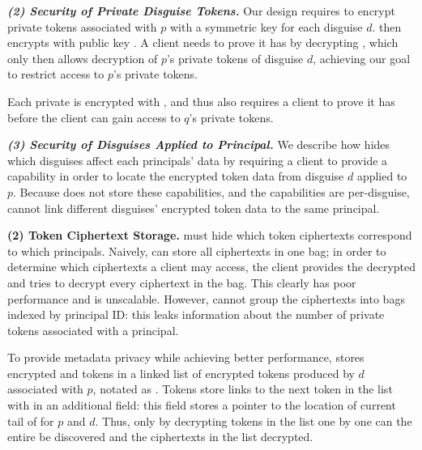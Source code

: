 \vspace{6pt}\noindent\textbf{\emph{(2) Security of Private Disguise Tokens.}}
Our design requires \sys to encrypt private \tdata{} tokens associated with $p$ with a symmetric key
 for each disguise $d$. \sys then encrypts  with public key .  
A client needs to prove it has  by decrypting , which only then allows decryption
of $p$'s private tokens of disguise $d$, achieving our goal to restrict access to $p$'s private
tokens.

Each private  is encrypted with , and thus also requires a client to prove it has
 before the client can gain access to $q$'s private tokens.

\vspace{6pt}\noindent\textbf{\emph{(3) Security of Disguises Applied to Principal.}}
We describe how \sys hides which disguises affect each principals' data by requiring a client to
provide a capability  in order to locate the encrypted token data from disguise $d$ applied
to $p$. Because \sys does not store these capabilities, and the capabilities are per-disguise, \sys
cannot link different disguises' encrypted token data to the same principal.

\iffalse
\vspace{6pt}\noindent\textbf{(2) \tdata{} Token Ciphertext Storage.}
\sys must hide which token ciphertexts correspond to which principals.  Naively, \sys can store
all ciphertexts in one bag; in order to determine which ciphertexts a client may access, the client
provides the decrypted  and \sys tries to decrypt every ciphertext in the bag. This clearly
has poor performance and is unscalable.
However, \sys cannot group the ciphertexts into bags indexed by principal ID: this leaks information
about the number of private tokens associated with a principal.

To provide metadata privacy while achieving better performance, \sys stores encrypted  and
 tokens in a linked list of encrypted tokens produced by $d$ associated with $p$, notated
as . 
Tokens store links to the next token in the list with in an additional  field: this
field stores a pointer to the location of current tail of  for $p$ and $d$.
Thus, only by decrypting tokens in the list one by one can the entire  be discovered and
the ciphertexts in the list decrypted.


